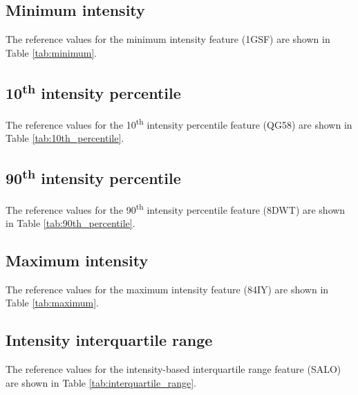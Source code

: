 \documentclass[fleqn,a4paper,oneside,openany]{book}
\newcommand\textid[1]{{\normalsize{\idfont #1}}}
\begin{document}
\subsection{Minimum intensity}
The reference values for the minimum intensity feature (\textid{1GSF}) are shown in Table \ref{tab:minimum}.

\begin{minipage}[l]{0.45\textwidth}

\end{minipage}
\quad
\begin{minipage}[r]{0.45\textwidth}

\end{minipage}
\FloatBarrier

\subsection{10\textsuperscript{th} intensity percentile}
The reference values for the 10\textsuperscript{th} intensity percentile feature (\textid{QG58}) are shown in Table \ref{tab:10th_percentile}.

\subsection{90\textsuperscript{th} intensity percentile}
The reference values for the 90\textsuperscript{th} intensity percentile feature (\textid{8DWT}) are shown in Table \ref{tab:90th_percentile}.

\begin{minipage}[l]{0.45\textwidth}

\end{minipage}
\quad
\begin{minipage}[r]{0.45\textwidth}

\end{minipage}
\FloatBarrier

\subsection{Maximum intensity}
The reference values for the maximum intensity feature (\textid{84IY}) are shown in Table \ref{tab:maximum}.

\subsection{Intensity interquartile range}
The reference values for the intensity-based interquartile range feature (\textid{SALO}) are shown in Table \ref{tab:interquartile_range}.
\end{document}
